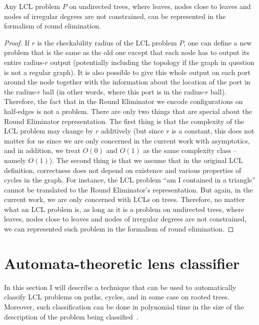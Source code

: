 \begin{theorem}\label{theorem:re_formalism_is_general}
Any LCL problem $P$ on undirected trees, where
leaves, nodes close to leaves and nodes of irregular degrees are
not constrained, can be represented in the formalism of round elimination.
\end{theorem}
\begin{proof}
  If $r$ is the checkability radius of the LCL problem $P$,
  one can define a new problem that is the same as the old
  one except that each node has to output its entire radius-$r$
  output (potentially including the topology if the graph in
  question is not a regular graph). It is also possible to
  give this whole
  output on each port around the node together with
  the information about the location of the port in the
  radius-$r$ ball (in other words, where this port is in the radius-$r$
  ball). Therefore, the fact that in the Round Eliminator we encode configurations
  on half-edges is not a problem.
  There are only two things that are special about the Round Eliminator representation.
  The first thing is that the
  complexity of the LCL problem may change by $r$ additively
  (but since $r$ is a constant, this does not matter for us since we
  are only concerned in the current work with asymptotics, and in addition,
  we treat $O(0)$ and $O(1)$ as the same complexity class -- namely $O(1)$).
  The second thing is that
  we assume that in the original LCL definition,
  correctness does not depend on existence and various properties
  of cycles in the graph. For instance, the LCL problem ``am I contained in a
  triangle'' cannot be translated to the Round Eliminator's representation.
  But again, in the current work,
  we are only concerned with LCLs on trees.
  Therefore, no matter what an LCL problem is, as long as it is a problem on
  undirected trees, where
  leaves, nodes close to leaves and nodes of irregular degrees are
  not constrained, we can represented such problem in the formalism of
  round elimination.
\end{proof}

\section{Automata-theoretic lens classifier}

In this section I will describe a technique that can be used to automatically
classify LCL problems on paths, cycles, and in some case on rooted trees.
Moreover, such classification can be done in polynomial time in the size
of the description of the problem being classified~\cite{Chang2020}.


